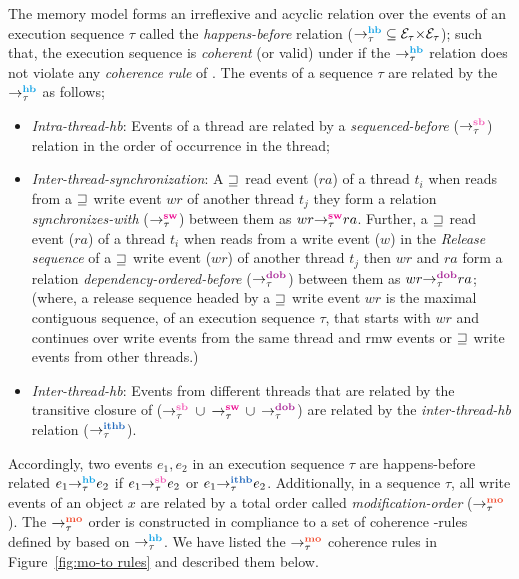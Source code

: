 The \cc memory model forms an irreflexive and acyclic relation over the events of 
an execution sequence $\tau$ called the {\em happens-before} relation 
($\setHB \subseteq \events_\tau {\times} \events_\tau$);
such that, the execution sequence is {\em coherent} (or valid) under \cc if 
the $\setHB$ relation does not violate any {\em coherence rule} of \cc.
%
The events of a sequence $\tau$ are related by the $\setHB$ as follows;
\begin{itemize}
	\item {\em Intra-thread-hb}: Events of a thread are related by a {\em sequenced-before}
	($\setSB$) relation in the order of occurrence in the thread;
	
	\item {\em Inter-thread-synchronization}: A ${\sqsupseteq}$ \acq read event ($ra$) of a thread 
	$t_i$ when reads from a ${\sqsupseteq}$ \rel write event $wr$ of another thread $t_j$ they form a
	relation {\em synchronizes-with} ($\setSW$) between them as $\sw{\tau}{wr}{ra}$.
	Further, a ${\sqsupseteq}$ \acq read event ($ra$) of a thread $t_i$ when reads from a write 
	event ($w$) in the {\em Release sequence} \cite{C11} of a ${\sqsupseteq}$ \rel write event ($wr$) of 
	another thread $t_j$ then $wr$ and $ra$ form a relation {\em dependency-ordered-before}
	($\setDOB$) between them as $\dob{\tau}{wr}{ra}$;
	(where, a release sequence headed by a ${\sqsupseteq}$ \rel write event $wr$ is the maximal 
	contiguous sequence, of an execution sequence $\tau$, that starts with $wr$ and continues 
	over write events from the same thread and rmw events or ${\sqsupseteq}$ \rel write events from
	other threads.)
	
	\item {\em Inter-thread-hb}: Events from different threads that are related by the 
	transitive closure of ($\setSB$ $\cup$ $\setSW$ $\cup$ $\setDOB$) are related by 
	the {\em inter-thread-hb} relation ($\setITHB$). 
\end{itemize}

Accordingly, two events $e_1,e_2$ in an execution sequence $\tau$ are happens-before 
related \ie
$\hb{\tau}{e_1}{e_2}$ if $\seqb{\tau}{e_1}{e_2}$ or $\ithb{\tau}{e_1}{e_2}$.
%
Additionally, in a sequence $\tau$, all write events of an object $x$ are related by a 
total order called {\em modification-order} ($\setMO$).
%
The $\setMO$ order is constructed in compliance to a set of coherence
\lmo-rules defined by \cc based on $\setHB$. 
%
We have listed the $\setMO$ coherence rules in Figure~\ref{fig:mo-to rules} and 
described them below.

